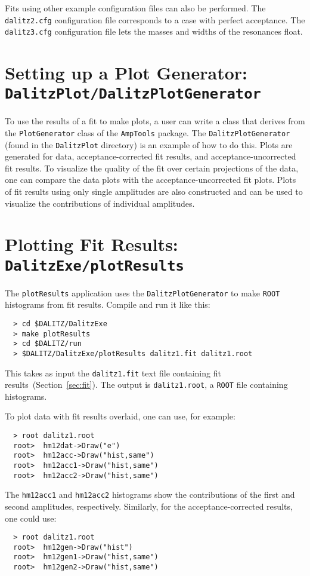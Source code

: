 \documentclass[11pt]{article}
\begin{document}
Fits using other example configuration files can also be performed.  The {\tt dalitz2.cfg} configuration file corresponds to a case with perfect acceptance.  The {\tt dalitz3.cfg} configuration file lets the masses and widths of the resonances float.

\section{Setting up a Plot Generator: \\
{\tt DalitzPlot/DalitzPlotGenerator}}
\label{sec:dpg}

To use the results of a fit to make plots, a user can write a class that derives from the {\tt PlotGenerator} class of the {\tt AmpTools} package.  The {\tt DalitzPlotGenerator} (found in the {\tt DalitzPlot} directory) is an example of how to do this.  Plots are generated for data, acceptance-corrected fit results, and acceptance-uncorrected fit results.  To visualize the quality of the fit over certain projections of the data, one can compare the data plots with the acceptance-uncorrected fit plots.  Plots of fit results using only single amplitudes are also constructed and can be used to visualize the contributions of individual amplitudes.


\section{Plotting Fit Results: \\
{\tt DalitzExe/plotResults}}

The {\tt plotResults} application uses the {\tt DalitzPlotGenerator} to make {\tt ROOT} histograms from fit results.  Compile and run it like this:
\begin{verbatim}
  > cd $DALITZ/DalitzExe
  > make plotResults
  > cd $DALITZ/run
  > $DALITZ/DalitzExe/plotResults dalitz1.fit dalitz1.root
\end{verbatim}
This takes as input the {\tt dalitz1.fit} text file containing fit results~(Section~\ref{sec:fit}).  The output is {\tt dalitz1.root}, a {\tt ROOT} file containing histograms.

To plot data with fit results overlaid, one can use, for example:
\begin{verbatim}
  > root dalitz1.root
  root>  hm12dat->Draw("e")
  root>  hm12acc->Draw("hist,same")
  root>  hm12acc1->Draw("hist,same")
  root>  hm12acc2->Draw("hist,same")
\end{verbatim}
The {\tt hm12acc1} and {\tt hm12acc2} histograms show the contributions of the first and second amplitudes, respectively.  Similarly, for the acceptance-corrected results, one could use:
\begin{verbatim}
  > root dalitz1.root
  root>  hm12gen->Draw("hist")
  root>  hm12gen1->Draw("hist,same")
  root>  hm12gen2->Draw("hist,same")
\end{verbatim}
\end{document}

